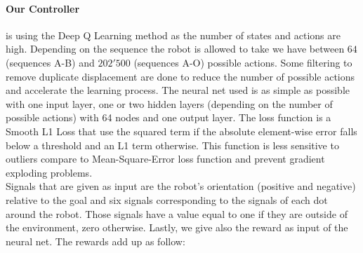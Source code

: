        \paragraph{Our Controller} is using the Deep Q Learning method as the number of states and actions are high. Depending on the sequence the robot is allowed to take we have between $64$ (sequences A-B) and $202'500$ (sequences A-O) possible actions. Some filtering to remove duplicate displacement are done to reduce the number of possible actions and accelerate the learning process. The neural net used is as simple as possible with one input layer, one or two hidden layers (depending on the number of possible actions) with 64 nodes and one output layer. The loss function is a Smooth L1 Loss that use the squared term if the absolute element-wise error falls below a threshold and an L1 term otherwise. This function is less sensitive to outliers compare to Mean-Square-Error loss function and prevent gradient exploding problems.\\
        Signals that are given as input are the robot's orientation (positive and negative) relative to the goal and six signals corresponding to the signals of each dot around the robot. Those signals have a value equal to one if they are outside of the environment, zero otherwise. Lastly, we give also the reward as input of the neural net. The rewards add up as follow:
